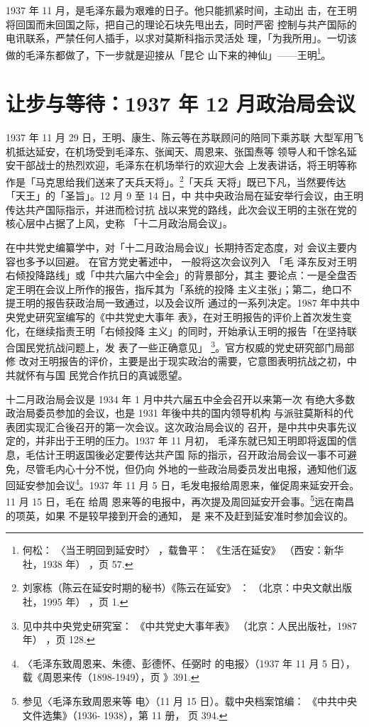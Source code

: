 1937 年 11 月，是毛泽东最为艰难的日子。他只能抓紧时间，主动出
击，在王明将回国而未回国之际，把自己的理论石块先甩出去，同时严密
控制与共产国际的电讯联系，严禁任何人插手，以求对莫斯科指示灵活处
理，「为我所用」。一切该做的毛泽东都做了，下一步就是迎接从「昆仑
山下来的神仙」——王明\footnote{何松：
〈当王明回到延安时〉
，载鲁平：
《生活在延安》
（西安：新华社，1938 年）
，页 57.}。


\section{让步与等待：1937 年 12 月政治局会议}

1937 年 11 月 29 日，王明、康生、陈云等在苏联顾问的陪同下乘苏联
大型军用飞机抵达延安，在机场受到毛泽东、张闻天、周恩来、张国焘等
领导人和千馀名延安干部战士的热烈欢迎，毛泽东在机场举行的欢迎大会
上发表讲话，将王明等称作是「马克思给我们送来了天兵天将」。\footnote{刘家栋（陈云在延安时期的秘书）《陈云在延安》
：
（北京：中央文献出版社，1995 年）
，页 1.}「天兵
天将」既已下凡，当然要传达「天王」的「圣旨」。12 月 9 至 14 日，中
共中央政治局在延安举行会议，由王明传达共产国际指示，并进而检讨抗
战以来党的路线，此次会议王明的主张在党的核心层中占据了上风，史称
「十二月政治局会议」。

在中共党史编纂学中，对「十二月政治局会议」长期持否定态度，对 会议主要内
容也多予以回避。 在官方党史著述中， 一般将这次会议列入 「毛 泽东反对王明
右倾投降路线」或「中共六届六中全会」的背景部分，其主 要论点：一是全盘否
定王明在会议上所作的报告，指斥其为「系统的投降 主义主张」；第二，绝口不
提王明的报告获政治局一致通过，以及会议所 通过的一系列决定。1987 年中共中
央党史研究室编写的《中共党史大事年 表》，在对王明报告的评价上首次发生变
化，在继续指责王明「右倾投降 主义」的同时，开始承认王明的报告「在坚持联
合国民党抗战问题上，发 表了一些正确意见」 \footnote{见中共中央党史研究室：
《中共党史大事年表》
（北京：人民出版社，1987 年）
，页 128.}。官方权威的党史研究部门局部修
改对王明报告的评价，主要是出于现实政治的需要，它意图表明抗战之初，中
共就怀有与国 民党合作抗日的真诚愿望。

十二月政治局会议是 1934 年 1 月中共六届五中全会召开以来第一次 有绝大多数
政治局委员参加的会议，也是 1931 年後中共的国内领导机构 与派驻莫斯科的代
表团实现汇合後召开的第一次会议。这次政治局会议的 召开，是中共中央事先议
定的，并非出于王明的压力。1937 年 11 月初， 毛泽东就已知王明即将返国的信
息，毛估计王明返国後必定要传达共产国 际的指示，召开政治局会议一事不可避
免，尽管毛内心十分不悦，但仍向 外地的一些政治局委员发出电报，通知他们返
回延安参加会议\footnote{〈毛泽东致周恩来、朱德、彭德怀、任弼时
的电报〉（1937 年 11 月 5 日），载《周恩来传（1898-1949），页 》391.}。1937 年 
11 月 5 日，毛发电报给周恩来，催促周来延安开会。 11 月 15 日，毛在 给周
恩来等的电报中，再次提及周回延安开会事。\footnote{参见〈毛泽东致周恩来等
电〉（11 月 15 日）。载中央档案馆编： 《中共中央文件选集》（1936-
1938），第 11 册， 页 394. }远在南昌的项英，如果 不是较早接到开会的通知，
是 来不及赶到延安准时参加会议的。

